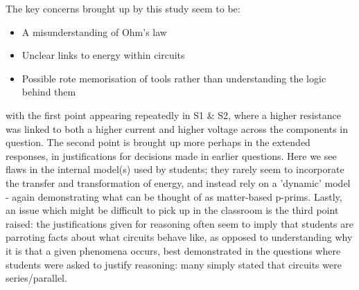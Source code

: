 \documentclass[a4paper,openany,nobib]{tufte-book}
\begin{document}
The key concerns brought up by this study seem to be:
\begin{itemize}
	\item A misunderstanding of Ohm's law
	\item Unclear links to energy within circuits
	\item Possible rote memorisation of tools rather than understanding the logic behind them
\end{itemize}
with the first point appearing repeatedly in S1 \& S2, where a higher resistance was linked to both a higher current and higher voltage across the components in question.
The second point is brought up more perhaps in the extended responses, in justifications for decisions made in earlier questions. Here we see flaws in the internal model(s) used by students; they rarely seem to incorporate the transfer and transformation of energy, and instead rely on a 'dynamic' model - again demonstrating what can be thought of as matter-based p-prims.
Lastly, an issue which might be difficult to pick up in the classroom is the third point raised: the justifications given for reasoning often seem to imply that students are parroting facts about what circuits behave like,
as opposed to understanding why it is that a given phenomena occurs, best demonstrated in the questions where students were asked to justify reasoning: many simply stated that circuits were series/parallel.
\end{document}
